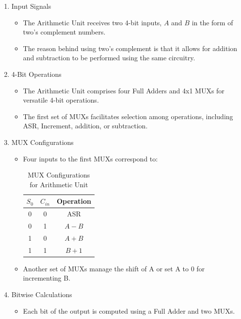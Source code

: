 \documentclass{article}
\begin{document}
\begin{enumerate}
  \item Input Signals
    \begin{itemize}
      \item The Arithmetic Unit receives two 4-bit inputs, \(A\) and \(B\) in
        the form of two's complement numbers.
      \item The reason behind using two's complement is that it allows for
        addition and subtraction to be performed using the same circuitry.
    \end{itemize}
  \item 4-Bit Operations
    \begin{itemize}
      \item The Arithmetic Unit comprises four Full Adders and 4x1 MUXs for
        versatile 4-bit operations. 
      \item The first set of MUXs facilitates selection among operations,
        including ASR, Increment, addition, or subtraction. 
    \end{itemize}
  \item MUX Configurations
    \begin{itemize}
      \item Four inputs to the first MUXs correspond to:
        \begin{table}[H]
          \caption{MUX Configurations for Arithmetic Unit}
          \begin{center}
            \begin{tabular}{c|c|c}
              \hline
              \( S_{0} \) & \( C_{in} \) & Operation \\
              \hline
              0 & 0 & ASR \\
              0 & 1 & $A - B$ \\
              1 & 0 & $A + B$ \\
              1 & 1 & $B + 1$ \\
              \hline
            \end{tabular}
          \end{center}
        \end{table}
      \item Another set of MUXs manage the shift of A or set A to 0 for incrementing B. 
    \end{itemize}
  \item Bitwise Calculations
    \begin{itemize}
      \item Each bit of the output is computed using a Full Adder and two MUXs. 

\end{itemize}
\end{enumerate}
\end{document}
